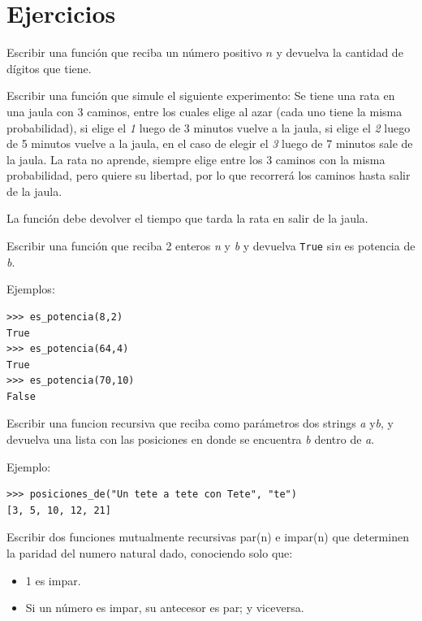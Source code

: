 \newpage
\section{Ejercicios}

\begin{ejercicio}
Escribir una función que reciba un número positivo $n$
y devuelva la cantidad de dígitos que tiene.
\end{ejercicio}

\begin{ejercicio}
Escribir una función que simule el siguiente experimento:
Se tiene una rata en una jaula con 3 caminos, entre los cuales elige
al azar (cada uno tiene la misma probabilidad), si elige el {\it 1} luego
de 3 minutos vuelve a la jaula, si elige el {\it 2} luego de 5 minutos vuelve a
la jaula, en el caso de elegir el {\it 3} luego de 7 minutos sale de la jaula.
La rata no aprende, siempre elige entre los 3 caminos con la misma probabilidad,
pero quiere su libertad, por lo que recorrerá los caminos hasta salir de la jaula.

La función debe devolver el tiempo que tarda la rata en salir de la jaula.
\end{ejercicio}

\begin{ejercicio}
Escribir una función que reciba 2 enteros {\it n} y {\it b}
y devuelva \verb!True! si{\it n} es potencia de {\it b}.

Ejemplos:
\begin{verbatim}
>>> es_potencia(8,2)
True
>>> es_potencia(64,4)
True
>>> es_potencia(70,10)
False
\end{verbatim}
\end{ejercicio}

\begin{ejercicio}
Escribir una funcion recursiva que reciba como parámetros dos strings
{\it a} y{\it b}, y devuelva una lista con las posiciones en donde se encuentra
{\it b} dentro de {\it a}.

Ejemplo:
\begin{verbatim}
>>> posiciones_de("Un tete a tete con Tete", "te")
[3, 5, 10, 12, 21]
\end{verbatim}
\end{ejercicio}

\begin{ejercicio}
Escribir dos funciones mutualmente recursivas par(n) e impar(n) que
determinen la paridad del numero natural dado, conociendo solo que:
\begin{itemize}
    \item 1 es impar.
    \item Si un número es impar, su antecesor es par; y viceversa.
\end{itemize}
\end{ejercicio}


